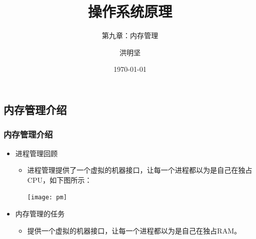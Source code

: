 \documentclass[CJKutf8,xcolor=pdftex,dvipsnames,table]{beamer}
\begin{document}
\begin{CJK*}{UTF8}{song}

  \title{ 操作系统原理}
  \subtitle{ 第九章：内存管理}
	\author{ 洪明坚}
  \date{\today}


  \frame{\titlepage}

  \section{内存管理介绍}
  
  \begin{frame}
    \frametitle{内存管理介绍} \pause
    \begin{itemize}
    \item{进程管理回顾} \pause
      \begin{itemize}
      \item{进程管理提供了一个虚拟的机器接口，让每一个进程都以为是自己在独占CPU，如下图所示：} \pause
        \begin{center}
          \texttt{[image: pm]} \pause
        \end{center}
      \end{itemize}
    \item{内存管理的任务} \pause
      \begin{itemize}
      \item{提供一个虚拟的机器接口，让每一个进程都以为是自己在独占RAM。}
      \end{itemize}
    \end{itemize}
  \end{frame}
  

\end{CJK*}
\end{document}
